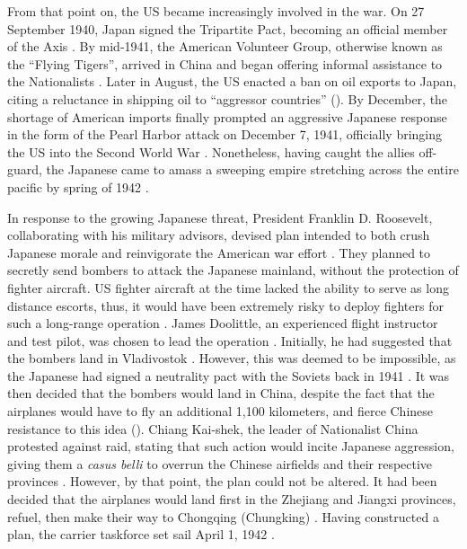 \documentclass[12pt, a4paper, twoside]{article}
\begin{document}
From that point on, the US became increasingly involved in the war. On 27 September 1940, Japan signed the Tripartite Pact, becoming an official member of the Axis \autocite{Britannica2023TripartitePact}. By mid-1941, the American Volunteer Group, otherwise known as the “Flying Tigers”, arrived in China and began offering informal assistance to the Nationalists \autocite{Doubek2021FlyingTigersNPR}. Later in August, the US enacted a ban on oil exports to Japan, citing a reluctance in shipping oil to “aggressor countries” (\cites[p.\ 74]{Feis1950RoadToPearlHarbor}{Roosevelt1941FreezingJapaneseAssets}). By December, the shortage of American imports finally prompted an aggressive Japanese response in the form of the Pearl Harbor attack on December 7, 1941, officially bringing the US into the Second World War \autocite{TAMUCC2024PearlHarborMotives}. Nonetheless, having caught the allies off-guard, the Japanese came to amass a sweeping empire stretching across the entire pacific by spring of 1942 \autocite{WWIIMuseum2019PacificStrategy}.

In response to the growing Japanese threat, President Franklin D. Roosevelt, collaborating with his military advisors, devised plan intended to both crush Japanese morale and reinvigorate the American war effort \autocite[p.\ 10]{Glines1988DoolittleRaid}. They planned to secretly send bombers to attack the Japanese mainland, without the protection of fighter aircraft. US fighter aircraft at the time lacked the ability to serve as long distance escorts, thus, it would have been extremely risky to deploy fighters for such a long-range operation \autocite{RogersNDInnovationDoolittleBlackMonday}. James Doolittle, an experienced flight instructor and test pilot, was chosen to lead the operation \autocite{Britannica2024JamesHDoolittle}. Initially, he had suggested that the bombers land in Vladivostok \autocite[p.\ 27]{Glines1988DoolittleRaid}. However, this was deemed to be impossible, as the Japanese had signed a neutrality pact with the Soviets back in 1941 \autocite{MolotovMatsuokaTatekawa1941NeutralityPactText}. It was then decided that the bombers would land in China, despite the fact that the airplanes would have to fly an additional 1,100 kilometers, and fierce Chinese resistance to this idea (\cites{Britannica2024DoolittleRaid}[p.\ 32]{Chun2006DoolittleRaid}[p.\ 27]{Glines1988DoolittleRaid}). Chiang Kai-shek, the leader of Nationalist China protested against raid, stating that such action would incite Japanese aggression, giving them a \emph{casus belli} to overrun the Chinese airfields and their respective provinces \autocite[p.\ 209]{Taylor2009Generalissimo}. However, by that point, the plan could not be altered. It had been decided that the airplanes would land first in the Zhejiang and Jiangxi provinces, refuel, then make their way to Chongqing (Chungking) \autocite[p.\ 32]{Chun2006DoolittleRaid}. Having constructed a plan, the carrier taskforce set sail April 1, 1942 \autocite[p.\ 440]{CravenCate1948AAFWW2Vol1}.
\end{document}
